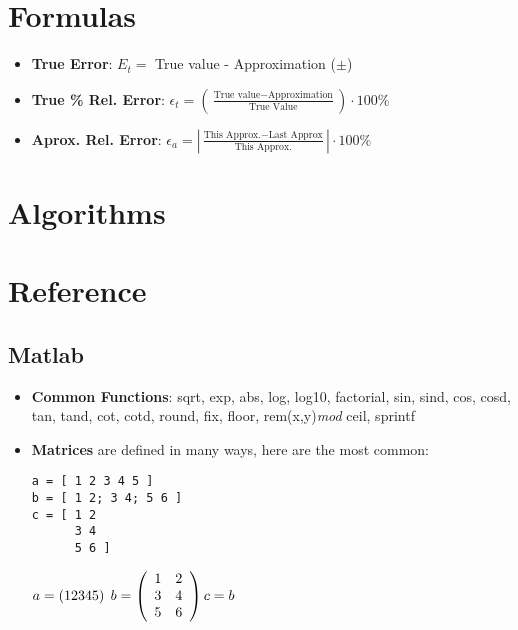 \documentclass[fontsize=5pt]{scrartcl}
\begin{document}
\begin{multicols}{3}
  \section{Formulas}
      \begin{itemize}
        \item \textbf{True Error}: $E_t =$ True value - Approximation ($\pm$)
        \item \textbf{True \% Rel. Error}: $\epsilon_t = (\frac{\text{True value} - \text{Approximation}}{\text{True Value}})\cdot100\%$
        \item \textbf{Aprox. Rel. Error}: $\epsilon_a =  |\frac{\text{This Approx.} - \text{Last Approx}}{\text{This Approx.}}|\cdot100\%$
      \end{itemize}
      
  \section{Algorithms}
    
      
  \section{Reference}
    \subsection{Matlab}
      \begin{itemize}
        \item \textbf{Common Functions}:
          sqrt, 
          exp, 
          abs,  
          log, 
          log10, 
          factorial, 
          sin, 
          sind, 
          cos,  
          cosd, 
          tan, 
          tand, 
          cot, 
          cotd, 
          round, 
          fix, 
          floor, 
          rem(x,y)\textit{mod}
          ceil, 
          sprintf
        \item \textbf{Matrices} are defined in many ways, here are the most common:
          \lstset{language=Matlab}
          \begin{lstlisting}
a = [ 1 2 3 4 5 ]
b = [ 1 2; 3 4; 5 6 ]
c = [ 1 2
      3 4
      5 6 ]
          \end{lstlisting}%
          $%
          a = \left( 1 2 3 4 5 \right)\hspace{1mm}
          b = \left( \begin{array}{cc}
                      1 & 2 \\
                      3 & 4 \\ 
                      5 & 6 \\
                    \end{array}
                    \right)
          c = b
          $
        \end{itemize}

\end{multicols}
\end{document}
